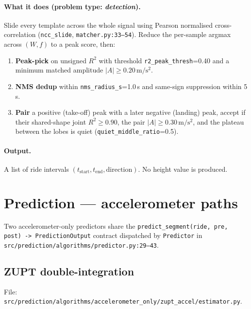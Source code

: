 \documentclass[11pt,a4paper]{article}
\begin{document}
\paragraph{What it does (problem type: \emph{detection}).}
Slide every template across the whole signal using Pearson normalised
cross-correlation (\texttt{ncc\_slide}, \texttt{matcher.py:33--54}).
Reduce the per-sample argmax across $(W,f)$ to a peak score, then:
\begin{enumerate}\setlength\itemsep{2pt}
  \item \textbf{Peak-pick} on unsigned $R^2$ with threshold
        \texttt{r2\_peak\_thresh}=0.40 and a minimum matched
        amplitude $|A|\ge 0.20\,\mathrm{m/s^2}$.
  \item \textbf{NMS dedup} within \texttt{nms\_radius\_s}=1.0\,s and
        same-sign suppression within 5\,s.
  \item \textbf{Pair} a positive (take-off) peak with a later
        negative (landing) peak, accept if their shared-shape
        joint $R^2 \ge 0.90$, the pair $|A|\ge 0.30\,\mathrm{m/s^2}$,
        and the plateau between the lobes is quiet
        (\texttt{quiet\_middle\_ratio}=0.5).
\end{enumerate}

\paragraph{Output.}
A list of ride intervals $(t_{\text{start}}, t_{\text{end}}, \text{direction})$. No height value is produced.

\section{Prediction --- accelerometer paths}

Two accelerometer-only predictors share the
\texttt{predict\_segment(ride, pre, post) -> PredictionOutput}
contract dispatched by \texttt{Predictor} in
\texttt{src/prediction/algorithms/predictor.py:29--43}.

\subsection{ZUPT double-integration}
File: \texttt{src/prediction/algorithms/accelerometer\_only/zupt\_accel/estimator.py}.
\end{document}
